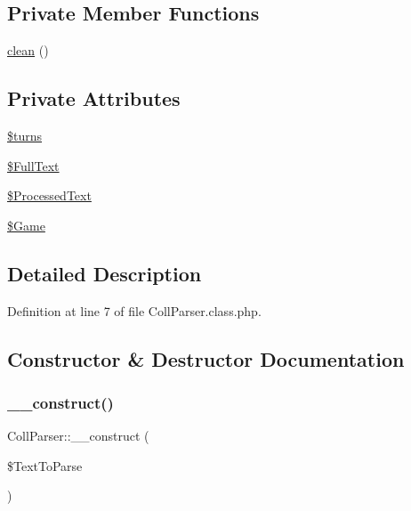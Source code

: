 \subsection*{Private Member Functions}
\begin{DoxyCompactItemize}
\item 
\hyperlink{class_coll_parser_a8c2cd975c9a254ae394a9335c6037582}{clean} ()
\end{DoxyCompactItemize}
\subsection*{Private Attributes}
\begin{DoxyCompactItemize}
\item 
\hyperlink{class_coll_parser_a713858989a8fd5c809c721a0cd787831}{\$turns}
\item 
\hyperlink{class_coll_parser_a5ba1b165a42ee0e41140795c9f4ae02a}{\$\+Full\+Text}
\item 
\hyperlink{class_coll_parser_ad2233d0ebcf39ecb4f29733d6dcbb979}{\$\+Processed\+Text}
\item 
\hyperlink{class_coll_parser_a176d0a851c115aceb6c31d1b042de670}{\$\+Game}
\end{DoxyCompactItemize}


\subsection{Detailed Description}


Definition at line 7 of file Coll\+Parser.\+class.\+php.



\subsection{Constructor \& Destructor Documentation}
\mbox{\label{class_coll_parser_a0642e6816338ececb86de51a3458a2a9}} 
\subsubsection{\texorpdfstring{\+\_\+\+\_\+construct()}{\_\_construct()}}
{\footnotesize\ttfamily Coll\+Parser\+::\+\_\+\+\_\+construct (\begin{DoxyParamCaption}\item[{}]{\$\+Text\+To\+Parse }\end{DoxyParamCaption})}

